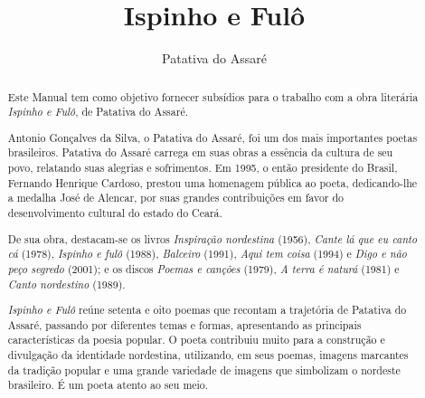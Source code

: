 \documentclass[12pt]{extarticle}
\begin{document}
\newcommand{\AutorLivro}{Patativa do Assaré}
\newcommand{\TituloLivro}{Ispinho e Fulô}
\newcommand{\Tema}{Ficção, mistério e fantasia}
\newcommand{\Genero}{Poema}
\newcommand{\imagemCapa}{./images/PNLD0033-01.png}
\newcommand{\issnppub}{---}
\newcommand{\issnepub}{---}
\newcommand{\colaborador}{\textbf{Vicente Castro e Bruno Gradella}}


\title{\TituloLivro}
\author{\AutorLivro}
\def\authornotes{\colaborador}

\date{}
\maketitle


\begin{abstract}
Este Manual tem como objetivo fornecer subsídios para o trabalho com a
obra literária \emph{Ispinho e Fulô}, de Patativa do Assaré.

Antonio Gonçalves da Silva, o Patativa do Assaré, foi um dos mais importantes
poetas brasileiros.  Patativa do Assaré carrega em suas obras a essência da 
cultura de seu povo, relatando suas alegrias e sofrimentos. Em 1995, o então 
presidente do Brasil, Fernando Henrique Cardoso, prestou uma homenagem pública 
ao poeta, dedicando-lhe a medalha José de Alencar, por suas grandes contribuições 
em favor do desenvolvimento cultural do estado do Ceará.

De sua obra, destacam-se os livros \textit{Inspiração nordestina} (1956), 
\textit{Cante lá que eu canto cá} (1978), \textit{Ispinho e fulô} (1988), 
\textit{Balceiro} (1991), \textit{Aqui tem coisa} (1994) e \textit{Digo e 
não peço segredo} (2001); e os discos \textit{Poemas e canções} (1979), 
\textit{A terra é naturá} (1981) e \textit{Canto nordestino} (1989).

\emph{Ispinho e Fulô} reúne setenta e oito poemas que recontam a trajetória 
de Patativa do Assaré, passando por diferentes temas e formas, apresentando as 
principais características da poesia popular. O poeta contribuiu muito para a 
construção e divulgação da identidade nordestina, utilizando, em seus poemas, 
imagens marcantes da tradição popular e uma grande variedade de imagens que 
simbolizam o nordeste brasileiro. É um poeta atento ao seu meio.


\end{abstract}
\end{document}
